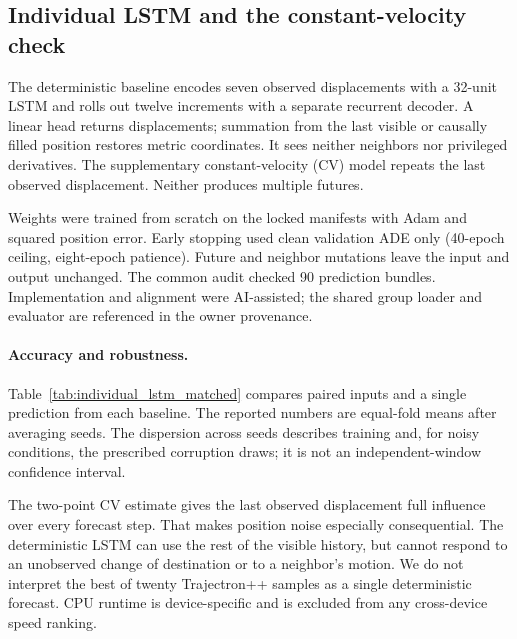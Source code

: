 \subsection{Individual LSTM and the constant-velocity check}
\label{sec:individual_lstm}
The deterministic baseline encodes seven observed displacements with a 32-unit
LSTM and rolls out twelve increments with a separate recurrent decoder. A linear
head returns displacements; summation from the last visible or causally filled
position restores metric coordinates. It sees neither neighbors nor privileged
derivatives. The supplementary constant-velocity (CV) model repeats the last
observed displacement. Neither produces multiple futures.

Weights were trained from scratch on the locked manifests with Adam and squared
position error. Early stopping used clean validation ADE only (40-epoch ceiling,
eight-epoch patience). Future and neighbor mutations leave the input and output
unchanged. The common audit checked 90 prediction bundles. Implementation and
alignment were AI-assisted; the shared group loader and evaluator are referenced
in the owner provenance.

\paragraph{Accuracy and robustness.}
Table~\ref{tab:individual_lstm_matched} compares paired inputs and a single
prediction from each baseline. The reported numbers are equal-fold means after
averaging seeds. The dispersion across seeds describes training and, for noisy
conditions, the prescribed corruption draws; it is not an independent-window
confidence interval.



The two-point CV estimate gives the last observed displacement full influence
over every forecast step. That makes position noise especially consequential.
The deterministic LSTM can use the rest of the visible history, but cannot
respond to an unobserved change of destination or to a neighbor's motion.
We do not interpret the best of twenty Trajectron++ samples as a single
deterministic forecast. CPU runtime is device-specific and is excluded from any
cross-device speed ranking.
